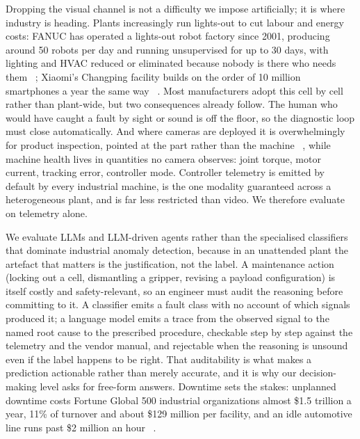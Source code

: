 Dropping the visual channel is not a difficulty we impose artificially; it is where industry is heading. Plants increasingly run lights-out to cut labour and energy costs: FANUC has operated a lights-out robot factory since 2001, producing around 50 robots per day and running unsupervised for up to 30 days, with lighting and HVAC reduced or eliminated because nobody is there who needs them~\cite{imts2026lightsout}%
; Xiaomi's Changping facility builds on the order of 10 million smartphones a year the same way~\cite{metrologynews2024darkfactory}%
. Most manufacturers adopt this cell by cell rather than plant-wide, but two consequences already follow. The human who would have caught a fault by sight or sound is off the floor, so the diagnostic loop must close automatically. And where cameras are deployed it is overwhelmingly for product inspection, pointed at the part rather than the machine~\cite{metrologynews2024darkfactory}%
, while machine health lives in quantities no camera observes: joint torque, motor current, tracking error, controller mode. Controller telemetry is emitted by default by every industrial machine, is the one modality guaranteed across a heterogeneous plant, and is far less restricted than video. We therefore evaluate on telemetry alone.

We evaluate LLMs and LLM-driven agents rather than the specialised classifiers that dominate industrial anomaly detection, because in an unattended plant the artefact that matters is the justification, not the label. A maintenance action (locking out a cell, dismantling a gripper, revising a payload configuration) is itself costly and safety-relevant, so an engineer must audit the reasoning before committing to it. A classifier emits a fault class with no account of which signals produced it; a language model emits a trace from the observed signal to the named root cause to the prescribed procedure, checkable step by step against the telemetry and the vendor manual, and rejectable when the reasoning is unsound even if the label happens to be right. That auditability is what makes a prediction actionable rather than merely accurate, and it is why our decision-making level asks for free-form answers. Downtime sets the stakes: unplanned downtime costs Fortune Global 500 industrial organizations almost \$1.5 trillion a year, 11\% of turnover and about \$129 million per facility, and an idle automotive line runs past \$2 million an hour~\cite{senseye2023downtime}%
.

